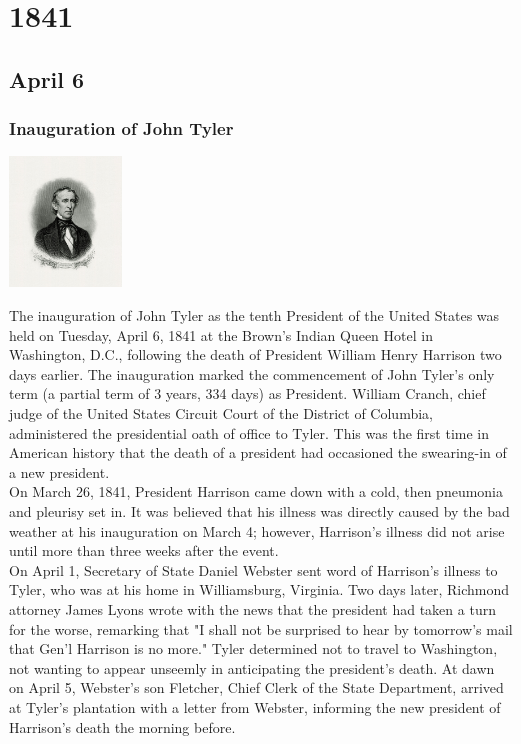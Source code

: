 \documentclass[11pt]{report}
\begin{document}
\chapter{1841}
\section{April 6}
\subsection{Inauguration of John Tyler}
\vspace{2mm}\begin{center}\includegraphics[width=3cm]{./img/johnTyler.jpg}\end{center}
The inauguration of John Tyler as the tenth President of the United States was held on Tuesday, April 6, 1841 at the Brown’s Indian Queen Hotel in Washington, D.C., following the death of President William Henry Harrison two days earlier. The inauguration marked the commencement of John Tyler's only term (a partial term of 3 years, 334 days) as President. William Cranch, chief judge of the United States Circuit Court of the District of Columbia, administered the presidential oath of office to Tyler. This was the first time in American history that the death of a president had occasioned the swearing-in of a new president.\\
\indent On March 26, 1841, President Harrison came down with a cold, then pneumonia and pleurisy set in. It was believed that his illness was directly caused by the bad weather at his inauguration on March 4; however, Harrison's illness did not arise until more than three weeks after the event.\\
\indent On April 1, Secretary of State Daniel Webster sent word of Harrison's illness to Tyler, who was at his home in Williamsburg, Virginia. Two days later, Richmond attorney James Lyons wrote with the news that the president had taken a turn for the worse, remarking that "I shall not be surprised to hear by tomorrow's mail that Gen'l Harrison is no more." Tyler determined not to travel to Washington, not wanting to appear unseemly in anticipating the president's death. At dawn on April 5, Webster's son Fletcher, Chief Clerk of the State Department, arrived at Tyler's plantation with a letter from Webster, informing the new president of Harrison's death the morning before.
\end{document}
